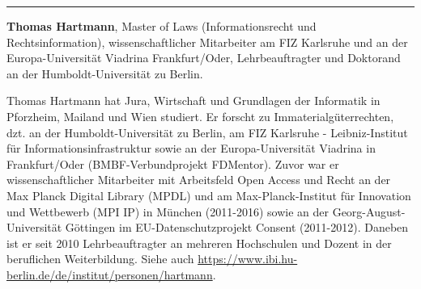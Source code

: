 \begin{center}\rule{0.5\linewidth}{\linethickness}\end{center}

\textbf{Thomas Hartmann}, Master of Laws (Informationsrecht und
Rechtsinformation), wissenschaftlicher Mitarbeiter am FIZ Karlsruhe und
an der Europa-Universität Viadrina Frankfurt/Oder, Lehrbeauftragter und
Doktorand an der Humboldt-Universität zu Berlin.

Thomas Hartmann hat Jura, Wirtschaft und Grundlagen der Informatik in
Pforzheim, Mailand und Wien studiert. Er forscht zu
Immaterialgüterrechten, dzt. an der Humboldt-Universität zu Berlin, am
FIZ Karlsruhe - Leibniz-Institut für Informationsinfrastruktur sowie an
der Europa-Universität Viadrina in Frankfurt/Oder (BMBF-Verbundprojekt
FDMentor). Zuvor war er wissenschaftlicher Mitarbeiter mit Arbeitsfeld
Open Access und Recht an der Max Planck Digital Library (MPDL) und am
Max-Planck-Institut für Innovation und Wettbewerb (MPI IP) in München
(2011-2016) sowie an der Georg-August-Universität Göttingen im
EU-Datenschutzprojekt Consent (2011-2012). Daneben ist er seit 2010
Lehrbeauftragter an mehreren Hochschulen und Dozent in der beruflichen
Weiterbildung. Siehe auch
\url{https://www.ibi.hu-berlin.de/de/institut/personen/hartmann}.
